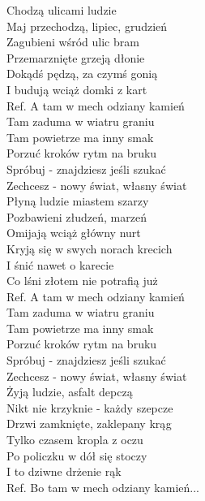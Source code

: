 

Chodzą ulicami ludzie \tab{} \\
Maj przechodzą, lipiec, grudzień \\
Zagubieni wśród ulic bram \tab{}\\
Przemarznięte grzeją dłonie \tab{} \\
Dokądś pędzą, za czymś gonią \tab{}\\
I budują wciąż domki z kart \tab{}\\
\hops
Ref. A tam w mech odziany kamień \\
 Tam zaduma w wiatru graniu  \\
 Tam powietrze ma inny smak \\
 Porzuć kroków rytm na bruku \\
 Spróbuj - znajdziesz jeśli szukać \\
 Zechcesz - nowy świat, własny świat  \\
\hops
Płyną ludzie miastem szarzy \\
Pozbawieni złudzeń, marzeń \\
Omijają wciąż główny nurt \\
Kryją się w swych norach krecich \\
I śnić nawet o karecie \\
Co lśni złotem nie potrafią już \\
\hops
Ref. A tam w mech odziany kamień \\
 Tam zaduma w wiatru graniu \\
 Tam powietrze ma inny smak \\
 Porzuć kroków rytm na bruku \\
 Spróbuj - znajdziesz jeśli szukać \\
 Zechcesz - nowy świat, własny świat \\
\hops
Żyją ludzie, asfalt depczą \\
Nikt nie krzyknie - każdy szepcze \\
Drzwi zamknięte, zaklepany krąg \\
Tylko czasem kropla z oczu \\
Po policzku w dół się stoczy \\
I to dziwne drżenie rąk \\
\hops
Ref. Bo tam w mech odziany kamień...
